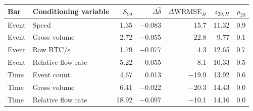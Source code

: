 \begin{tabular}{llrrrrr}
\toprule
Bar & Conditioning variable & $S_{99}$ & $\Delta\widehat{\delta}$ & $\Delta\mathrm{WRMSE}_{H}$ & $z_{20,H}$ & $\rho_{20}$ \\
\midrule
Event & Speed & 1.35 & $-$0.083 & 15.7 & 11.32 & 0.9 \\
Event & Gross volume & 2.72 & $-$0.055 & 22.8 & 9.77 & 0.1 \\
Event & Raw BTC/s & 1.79 & $-$0.077 & 4.3 & 12.65 & 0.7 \\
Event & Relative flow rate & 5.22 & $-$0.055 & 8.1 & 10.33 & 0.5 \\
\midrule
Time & Event count & 4.67 & 0.013 & $-$19.9 & 13.92 & 0.6 \\
Time & Gross volume & 6.41 & $-$0.022 & $-$20.3 & 14.43 & 0.0 \\
Time & Relative flow rate & 18.92 & $-$0.097 & $-$10.1 & 14.16 & 0.0 \\
\bottomrule
\end{tabular}
